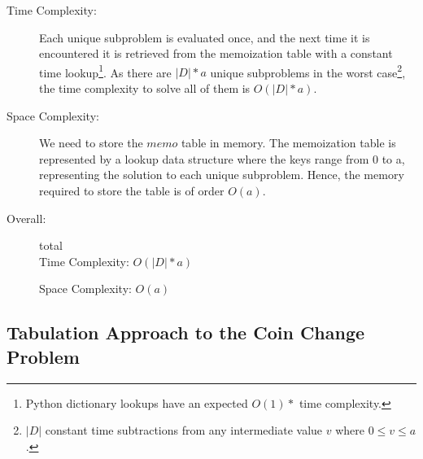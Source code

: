 \begin{description}
    \item[Time Complexity:]
        Each unique subproblem is evaluated once, and the next time it is encountered it is retrieved from the memoization table with a constant time lookup\footnote{Python dictionary lookups have an expected $O(1)*$ time complexity.}.
        As there are $|D| * a$ unique subproblems in the worst case\footnote{$|D|$ constant time subtractions from any intermediate value $v$ where $0 \leq v \leq a$.}, the time complexity to solve all of them is $O(|D| * a)$.
    
        
    \item[Space Complexity:] 
        We need to store the $memo$ table in memory.
        The memoization table is represented by a lookup data structure where the keys range from 0 to a,
        representing the solution to each unique subproblem.
        Hence, the memory required to store the table is of order $O(a)$.
        
    \item[Overall:] total\\
        Time Complexity: $O(|D| * a)$

        Space Complexity: $O(a)$
        
\end{description}

\subsection{Tabulation Approach to the Coin Change Problem}

